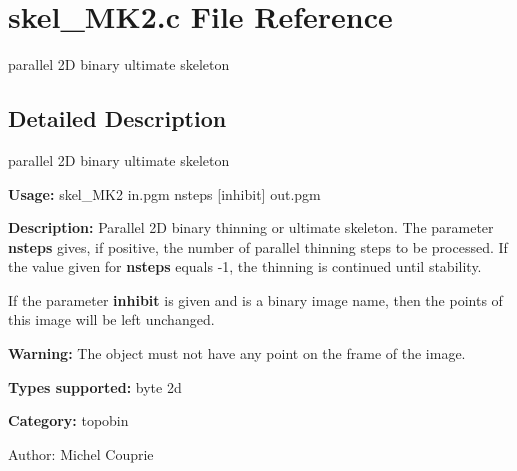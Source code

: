 \section{skel\_\-MK2.c File Reference}
\label{skel__MK2_8c}
parallel 2D binary ultimate skeleton 



\subsection{Detailed Description}
parallel 2D binary ultimate skeleton 

{\bf Usage:} skel\_\-MK2 in.pgm nsteps [inhibit] out.pgm

{\bf Description:} Parallel 2D binary thinning or ultimate skeleton. The parameter {\bf nsteps} gives, if positive, the number of parallel thinning steps to be processed. If the value given for {\bf nsteps} equals -1, the thinning is continued until stability.

If the parameter {\bf inhibit} is given and is a binary image name, then the points of this image will be left unchanged.

{\bf Warning:} The object must not have any point on the frame of the image.

{\bf Types supported:} byte 2d

{\bf Category:} topobin

\begin{Desc}
\item[Author:]Michel Couprie \end{Desc}
